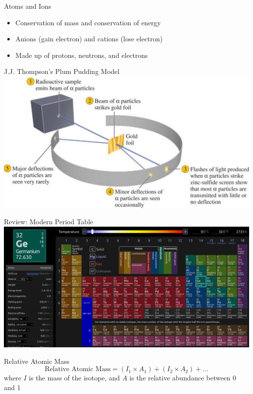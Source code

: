 \documentclass[11pt]{beamer}
\begin{document}
\begin{frame}{Atoms and Ions}
  \begin{itemize}
  \item Conservation of mass and conservation of energy
  \item Anions (gain electron) and cations (lose electron)
  \item Made up of protons, neutrons, and electrons
  \end{itemize}
\end{frame}

\begin{frame}{J.J. Thompson's Plum Pudding Model}
  \centering
  \includegraphics[scale=0.175]{alpha}
\end{frame}

\begin{frame}{Review: Modern Period Table}
  \centering
  \includegraphics[width=\linewidth]{ptable}
\end{frame}

\begin{frame}{Relative Atomic Mass}
  \begin{equation}
    \text{Relative Atomic Mass} = (I_1\times A_1) + (I_2\times A_2) + \dots
  \end{equation}
  where $I$ is the mass of the isotope, and $A$ is the
  relative abundance between 0 and 1
\end{frame}
\end{document}
